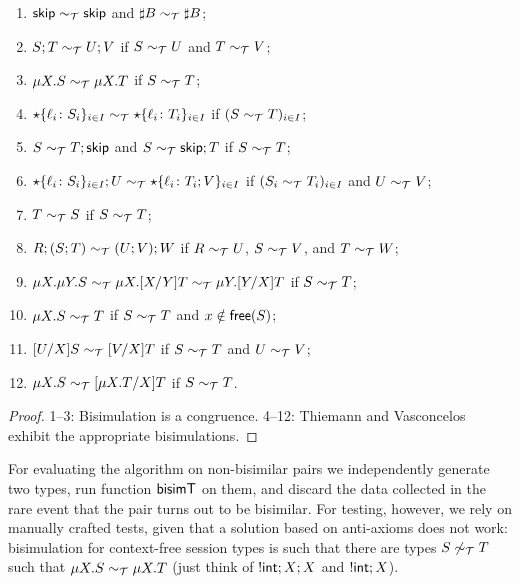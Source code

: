 \begin{theorem}
\label{thm:axioms}
  \begin{enumerate}
  \item $\mathsf{skip} \sim_\mathcal T \mathsf{skip}$ and $\sharp B \sim_\mathcal T \sharp B$;
  \item $S;T \sim_\mathcal T U;V$ if $S \sim_\mathcal T U$ and $T \sim_\mathcal T V$;
  \item $\mu X.S \sim_\mathcal T \mu X.T$ if $S \sim_\mathcal T T$;
  \item $\star\{\ell_i\colon S_i\}_{i\in I}\sim_\mathcal T
    \star\{\ell_i\colon T_i\}_{i\in I}$ if $(S \sim_\mathcal T T)_{i\in
      I}$;
  \item $S\sim_\mathcal T T;\mathsf{skip}$ and $S\sim_\mathcal T \mathsf{skip};T$ if $S \sim_\mathcal T T$;
  \item $\star\{\ell_i\colon S_i\}_{i\in I};U\sim_\mathcal T
    \star\{\ell_i\colon T_i;V\}_{i\in I}$ if $(S_i \sim_\mathcal T T_i)_{i\in
      I}$ and $U \sim_\mathcal T V$;
  \item $T \sim_\mathcal T S$ if $S \sim_\mathcal T T$;
  \item $R;(S;T) \sim_\mathcal T (U;V);W$ if $R \sim_\mathcal T U$, $S \sim_\mathcal T V$, and $T\sim_\mathcal T W$;
  \item
    $\mu X.\mu Y.S \sim_\mathcal T \mu X.[{X}/{Y}]T \sim_\mathcal T \mu Y.[{Y}/{X}]T$ if $S \sim_\mathcal T T$;
  \item $\mu X.S \sim_\mathcal T T$ if $S \sim_\mathcal T T$ and $x\notin\mathsf{free}(S)$;
  \item $[{U}/{X}]S\sim_\mathcal T [{V}/{X}]T$  if $S \sim_\mathcal T T$ and $U \sim_\mathcal T V$;
  \item $\mu X.S \sim_\mathcal T [{\mu X.T}/{X}]T$ if $S \sim_\mathcal T T$.
  \end{enumerate}
\end{theorem}
%
\begin{proof}
  1--3: Bisimulation is a congruence. 4--12: Thiemann and
  Vasconcelos~\cite{thiemann2016context} exhibit the appropriate
  bisimulations.
\end{proof}

For evaluating the algorithm on non-bisimilar pairs we independently
generate two types, run function $\mathsf{bisimT}$ on them, and discard the
data collected in the rare event that the pair turns out to be
bisimilar.
%
For testing, however, we rely on manually crafted tests, given that a
solution based on anti-axioms does not work: bisimulation for
context-free session types is such that there are types
$S \not\sim_\mathcal T T$ such that $\mu X.S \sim_\mathcal T \mu X.T$ (just think of
$!\mathsf{int};X;X$ and $!\mathsf{int};X$).

